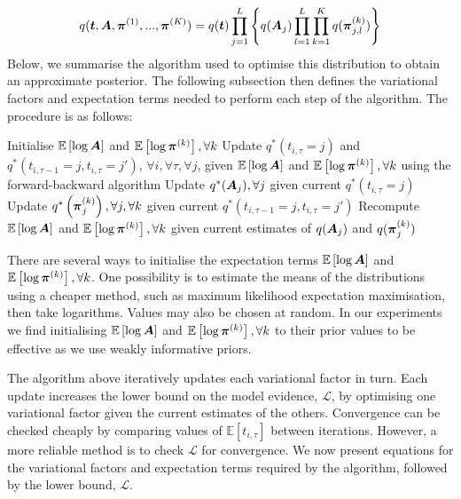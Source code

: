 \begin{equation}
  q(\boldsymbol t, \boldsymbol A, \boldsymbol\pi^{(1)},...,\boldsymbol\pi^{(K)}) = q(\boldsymbol t)\prod_{j=1}^L \left\{ q(\boldsymbol A_j)\prod_{l=1}^L \prod_{k=1}^K  q(\boldsymbol\pi_{j,l}^{(k)}) \right\}
\end{equation}
Below, we summarise the algorithm used to optimise this distribution to obtain an approximate posterior.
The following subsection then defines the variational factors and expectation terms needed to perform each step of the algorithm. The procedure is as follows:
\begin{algorithm}
 Initialise $\mathbb{E}\left[\log \boldsymbol A \right]$ 
 and $\mathbb{E}\left[\log\boldsymbol\pi^{(k)} \right], \forall k$\;
 {
 Update $q^*(t_{i,\tau}=j)$ and $q^*(t_{i,\tau-1}=j, t_{i,\tau}=j')$, $\forall i,\forall \tau,\forall j$,
 given $\mathbb{E}\left[\log \boldsymbol A \right]$ and 
 $\mathbb{E}\left[\log\boldsymbol\pi^{(k)} \right], \forall k$
 using the forward-backward algorithm\;
 Update $q^*(\boldsymbol A_j), \forall j$ given current $q^*(t_{i,\tau}=j)$\;
 Update $q^*\left(\boldsymbol\pi_j^{(k)}\right), \forall j, \forall k$ given current $q^*(t_{i,\tau-1}=j, t_{i,\tau}=j')$\;
 Recompute $\mathbb{E}\left[\log \boldsymbol A \right]$ 
 and $\mathbb{E}\left[\log\boldsymbol\pi^{(k)} \right], \forall k$ given current estimates of
 $q(\boldsymbol A_j)$ and $q(\boldsymbol\pi_j^{(k)})$\; 
 }
\end{algorithm}

There are several ways to initialise the expectation terms $\mathbb{E}\left[\log \boldsymbol A \right]$ 
 and $\mathbb{E}\left[\log\boldsymbol\pi^{(k)} \right], \forall k$. One possibility is to estimate the means 
 of the distributions using a cheaper method, such as maximum likelihood expectation maximisation, then
 take logarithms. Values may also be chosen at random.
  In our experiments we find initialising $\mathbb{E}\left[\log \boldsymbol A \right]$ 
 and $\mathbb{E}\left[\log\boldsymbol\pi^{(k)} \right], \forall k$ to their prior values to be effective
 as we use weakly informative priors.
 
The algorithm above iteratively updates each variational factor in turn. Each update increases the lower bound on the model evidence, $\mathcal{L}$, by optimising one variational factor given the current estimates of the others.  
Convergence can be checked cheaply by comparing values of $\mathbb{E}[t_{i,\tau}]$ between iterations. However, a more reliable method is to check $\mathcal{L}$ for convergence. We now present equations for the variational factors and expectation terms required by the algorithm, followed by the lower bound, $\mathcal{L}$. 

